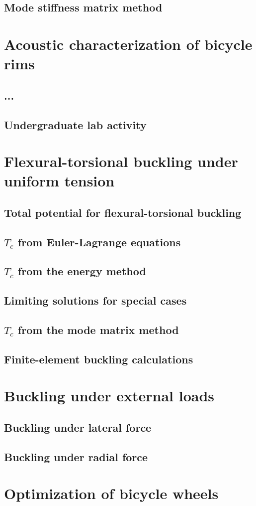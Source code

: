\documentclass{nuthesis}
\begin{document}
\section{Mode stiffness matrix method}


\chapter{Acoustic characterization of bicycle rims}
\section{...}
\section{Undergraduate lab activity}


\chapter{Flexural-torsional buckling under uniform tension}
\section{Total potential for flexural-torsional buckling}
\section{$T_c$ from Euler-Lagrange equations}
\section{$T_c$ from the energy method}
\section{Limiting solutions for special cases}
\section{$T_c$ from the mode matrix method}
\section{Finite-element buckling calculations}


\chapter{Buckling under external loads}
\section{Buckling under lateral force}
\section{Buckling under radial force}


\chapter{Optimization of bicycle wheels}
\end{document}
